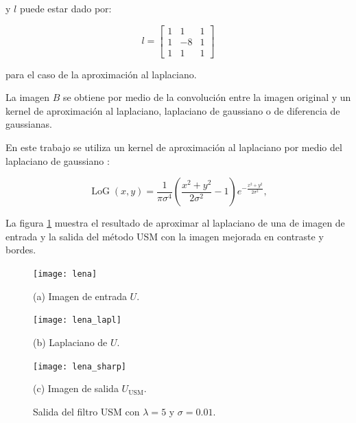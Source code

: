y $l$ puede estar dado por:

\begin{equation} l = \left[
\begin{array}{ccc}
1 & 1 & 1\\
1 & -8 & 1\\
1 & 1 & 1
\end{array}\right]
\end{equation}

para el caso de la aproximación al laplaciano.

La imagen $B$ se obtiene por medio de la convolución entre la imagen original y un kernel de aproximación al laplaciano, laplaciano de gaussiano o de diferencia de gaussianas.


En este trabajo se utiliza un kernel de aproximación al laplaciano por medio del laplaciano de gaussiano \cite{sotak1989laplacian}:

\begin{equation}
\label{eq:log}
\operatorname{LoG}(x,y) = \frac{1}{\pi\sigma^4}\left(\frac{x^2+y^2}{2\sigma^2} - 1\right)e^{-\frac{x^2+y^2}{2\sigma^2}},
\end{equation}

La figura \ref{fig:exampleUSM} muestra el resultado de aproximar al laplaciano de una de imagen de entrada y la salida del método USM con la imagen mejorada en contraste y bordes. 

\begin{figure}[H]
%
\begin{minipage}{0.25\textwidth}
  \centering
  \centerline{\texttt{[image: lena]}}
  \centerline{(a) Imagen de entrada $U$.}\medskip
\end{minipage}
\hfill
\begin{minipage}{0.25\textwidth}
  \centering
  \centerline{\texttt{[image: lena\_lapl]}}
  \centerline{(b) Laplaciano de $U$.}
\end{minipage}
\hfill
\begin{minipage}{0.25\textwidth}
  \centering
  \centerline{\texttt{[image: lena\_sharp]}}
  \centerline{(c) Imagen de salida $U_{\textrm{USM}}$.}\medskip
\end{minipage}
%
\caption[Ejemplo de mejora en imagen con ]{Salida del filtro USM con $\lambda = 5$ y $\sigma = 0.01$. \label{fig:exampleUSM}}
%
\end{figure}


